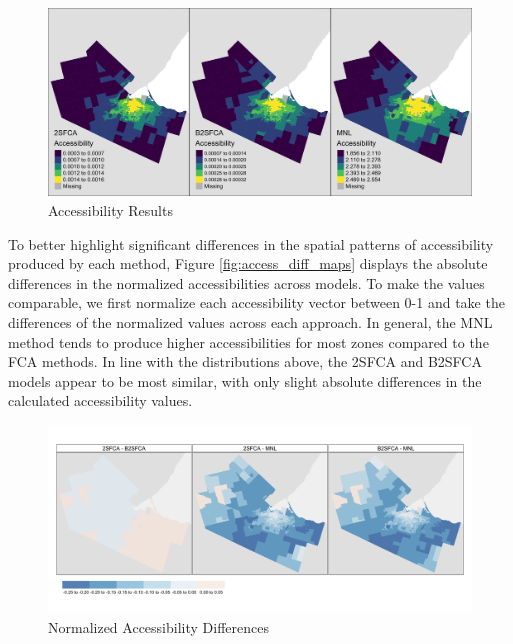 \documentclass[]{elsarticle} %
\begin{document}
\begin{figure}
\includegraphics[width=1\linewidth]{./img/access_maps} \caption{\label{fig:access_maps}Accessibility Results}\label{fig:plot access_maps}
\end{figure}

To better highlight significant differences in the spatial patterns of
accessibility produced by each method, Figure \ref{fig:access_diff_maps}
displays the absolute differences in the normalized accessibilities
across models. To make the values comparable, we first normalize each
accessibility vector between 0-1 and take the differences of the
normalized values across each approach. In general, the MNL method tends
to produce higher accessibilities for most zones compared to the FCA
methods. In line with the distributions above, the 2SFCA and B2SFCA
models appear to be most similar, with only slight absolute differences
in the calculated accessibility values.

\begin{figure}
\includegraphics[width=1\linewidth]{./img/access_diff_maps} \caption{\label{fig:access_diff_maps}Normalized Accessibility Differences}\label{fig:plot access_diff_maps}
\end{figure}
\end{document}
